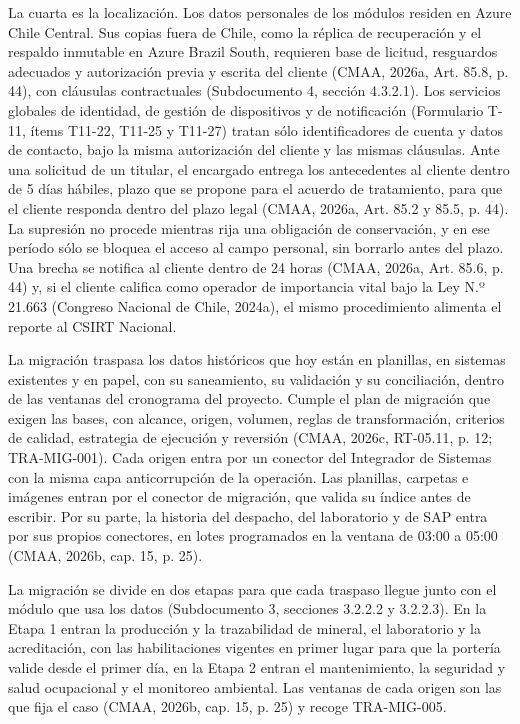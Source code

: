 \documentclass[subdoc]{../../comun/overfore}
\begin{document}
La cuarta es la localización. Los datos personales de los módulos residen en Azure Chile Central. Sus copias fuera de Chile, como la réplica de recuperación y el respaldo inmutable en Azure Brazil South, requieren base de licitud, resguardos adecuados y autorización previa y escrita del cliente (CMAA, 2026a, Art. 85.8, p. 44), con cláusulas contractuales (Subdocumento 4, sección 4.3.2.1). Los servicios globales de identidad, de gestión de dispositivos y de notificación (Formulario T-11, ítems T11-22, T11-25 y T11-27) tratan sólo identificadores de cuenta y datos de contacto, bajo la misma autorización del cliente y las mismas cláusulas. Ante una solicitud de un titular, el encargado entrega los antecedentes al cliente dentro de 5 días hábiles, plazo que se propone para el acuerdo de tratamiento, para que el cliente responda dentro del plazo legal (CMAA, 2026a, Art. 85.2 y 85.5, p. 44). La supresión no procede mientras rija una obligación de conservación, y en ese período sólo se bloquea el acceso al campo personal, sin borrarlo antes del plazo. Una brecha se notifica al cliente dentro de 24 horas (CMAA, 2026a, Art. 85.6, p. 44) y, si el cliente califica como operador de importancia vital bajo la Ley N.º 21.663 (Congreso Nacional de Chile, 2024a), el mismo procedimiento alimenta el reporte al CSIRT Nacional.

La migración traspasa los datos históricos que hoy están en planillas, en sistemas existentes y en papel, con su saneamiento, su validación y su conciliación, dentro de las ventanas del cronograma del proyecto. Cumple el plan de migración que exigen las bases, con alcance, origen, volumen, reglas de transformación, criterios de calidad, estrategia de ejecución y reversión (CMAA, 2026c, RT-05.11, p. 12; TRA-MIG-001). Cada origen entra por un conector del Integrador de Sistemas con la misma capa anticorrupción de la operación. Las planillas, carpetas e imágenes entran por el conector de migración, que valida su índice antes de escribir. Por su parte, la historia del despacho, del laboratorio y de SAP entra por sus propios conectores, en lotes programados en la ventana de 03:00 a 05:00 (CMAA, 2026b, cap. 15, p. 25).

La migración se divide en dos etapas para que cada traspaso llegue junto con el módulo que usa los datos (Subdocumento 3, secciones 3.2.2.2 y 3.2.2.3). En la Etapa 1 entran la producción y la trazabilidad de mineral, el laboratorio y la acreditación, con las habilitaciones vigentes en primer lugar para que la portería valide desde el primer día, en la Etapa 2 entran el mantenimiento, la seguridad y salud ocupacional y el monitoreo ambiental. Las ventanas de cada origen son las que fija el caso (CMAA, 2026b, cap. 15, p. 25) y recoge TRA-MIG-005.
\end{document}
